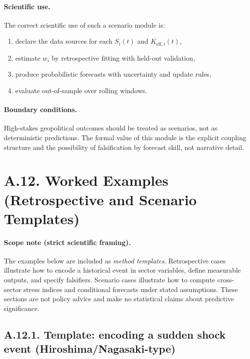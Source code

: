 \documentclass[13pt,a4paper]{article}
\begin{document}
	\paragraph{Scientific use.}
	The correct scientific use of such a scenario module is:
	\begin{enumerate}[leftmargin=*]
		\item declare the data sources for each $S_i(t)$ and $K_{\mathrm{eff},i}(t)$,
		\item estimate $w_i$ by retrospective fitting with held-out validation,
		\item produce probabilistic forecasts with uncertainty and update rules,
		\item evaluate out-of-sample over rolling windows.
	\end{enumerate}
	
	\paragraph{Boundary conditions.}
	High-stakes geopolitical outcomes should be treated as scenarios, not as deterministic predictions. The formal value of this module is the explicit coupling structure and the possibility of falsification by forecast skill, not narrative detail.
	\section*{A.12. Worked Examples (Retrospective and Scenario Templates)}
	\label{sec:worked-examples}
	
	\paragraph{Scope note (strict scientific framing).}
	The examples below are included as \emph{method templates}. Retrospective cases illustrate how to encode a historical event in sector variables, define measurable outputs, and specify falsifiers. Scenario cases illustrate how to compute cross-sector stress indices and conditional forecasts under stated assumptions. These sections are not policy advice and make no statistical claims about predictive significance.
	
	\subsection*{A.12.1. Template: encoding a sudden shock event (Hiroshima/Nagasaki-type)}
	
\end{document}
